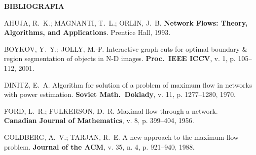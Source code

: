 \documentclass[final]{article}
\newcommand{\postersection}[1]{
    \par\vspace{0.55em}
    {\fontsize{34}{40}\selectfont\bfseries\color{textdark}#1}
    \par\vspace{0.2em}
}
\begin{document}
\begin{minipage}[t]{41.275cm}
\postersection{BIBLIOGRAFIA}
{\fontsize{25}{30}\selectfont
\begin{enumerate}[label={[\arabic*]}, leftmargin=1.8em, itemsep=0.18em, topsep=0.1em]
    \item AHUJA, R.\ K.; MAGNANTI, T.\ L.; ORLIN, J.\ B. \textbf{Network Flows: Theory, Algorithms, and Applications}. Prentice Hall, 1993.
    \item BOYKOV, Y.\ Y.; JOLLY, M.-P. Interactive graph cuts for optimal boundary \& region segmentation of objects in N-D images. \textbf{Proc.\ IEEE ICCV}, v. 1, p. 105--112, 2001.
    \item DINITZ, E.\ A. Algorithm for solution of a problem of maximum flow in networks with power estimation. \textbf{Soviet Math.\ Doklady}, v. 11, p. 1277--1280, 1970.
    \item FORD, L.\ R.; FULKERSON, D.\ R. Maximal flow through a network. \textbf{Canadian Journal of Mathematics}, v. 8, p. 399--404, 1956.
    \item GOLDBERG, A.\ V.; TARJAN, R.\ E. A new approach to the maximum-flow problem. \textbf{Journal of the ACM}, v. 35, n. 4, p. 921--940, 1988.
\end{enumerate}
}

\end{minipage}
\end{document}
